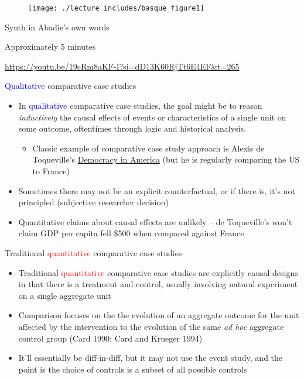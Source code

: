 \documentclass{beamer}
\begin{document}
\begin{frame}{}

\begin{figure}
\texttt{[image: ./lecture\_includes/basque\_figure1]}
\end{figure}

\end{frame}

\begin{frame}{Synth in Abadie's own words}

Approximately 5 minutes

\url{https://youtu.be/19cRm8aKF-I?si=dD13K60RjTt6E4EF&t=265}

\end{frame}



\begin{frame}{\textcolor{blue}{Qualitative} comparative case studies}
	
	\begin{itemize}
	\item In \textcolor{blue}{qualitative} comparative case studies, the goal might be to reason \emph{inductively} the causal effects of events or characteristics of a single unit on some outcome, oftentimes through logic and historical analysis.  
		\begin{itemize}
		\item Classic example of comparative case study approach is Alexis de Toqueville's \underline{Democracy in America} (but he is regularly comparing the US to France)
		\end{itemize}
	\item Sometimes there may not be an explicit counterfactual, or if there is, it's not principled (subjective researcher decision)
	\item Quantitative claims about causal effects are unlikely -- de Toqueville's won't claim GDP per capita fell \$500 when compared against France
	\end{itemize}
\end{frame}

\begin{frame}{Traditional \textcolor{red}{quantitative} comparative case studies}

\begin{itemize}
	\item Traditional  \textcolor{red}{quantitative}  comparative case studies are explicitly causal designs in that there is a treatment and control, usually involving natural experiment on a single aggregate unit
	\item Comparison focuses on the the evolution of an aggregate outcome for the unit affected by the intervention to the evolution of the same \emph{ad hoc} aggregate control group (Card 1990; Card and Krueger 1994)
	\item It'll essentially be diff-in-diff, but it may not use the event study, and the point is the choice of controls is a subset of all possible controls
\end{itemize}

\end{frame}
\end{document}
